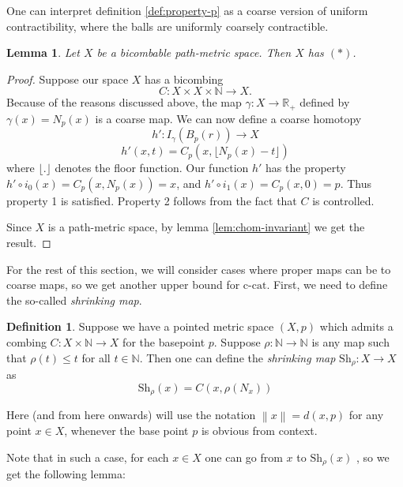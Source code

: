 \documentclass {amsart}
\newcommand {\ccat}     {\text{c-cat}}
\newcommand {\N}        {\mathbb{N}}
\newcommand {\Rplus}    {\mathbb{R}_{+}}
\newcommand {\shr}      {\text {Sh} _{\rho}}
\newcommand {\norm} [1] {\left\| #1 \right\|}
\newtheorem   {lemma}       [theorem] {Lemma}
\theoremstyle {definition}
\newtheorem   {definition}  [theorem] {Definition}
\begin{document}
One can interpret definition \ref{def:property-p} as a coarse version of uniform
contractibility, where the balls are uniformly coarsely contractible.

\begin{lemma}
    \label{lem:bicomb-property-p}
Let \( X \) be a bicombable path-metric space. Then \( X \) has \( (\ast) \).
\end{lemma}

\begin{proof}
  Suppose our space \( X \) has a bicombing
  \[ 
    C : X \times X \times \N \to X 
  .\]
  Because of the reasons discussed above, the map \( \gamma : X \to \Rplus \)
  defined by \( \gamma(x) = N_p(x) \) is a coarse map. We can now define a
  coarse homotopy
  \[
    h' : I_{\gamma} (B_p(r)) \to X
  \]
  \[
    h'(x, t) = C_p (x, \lfloor N_p(x) - t\rfloor)
  \]
  where \( \lfloor . \rfloor \) denotes the floor function. Our function \(
  h'\) has the property \( h' \circ i_0 (x) = C_p(x, N_p(x)) = x \), and \( h'
  \circ i_1 (x) = C_p(x, 0) = p \). Thus property 1 is satisfied. Property 2
  follows from the fact that \( C \) is controlled.

  Since \( X \) is a path-metric space, by lemma \ref{lem:chom-invariant} we get
  the result.
\end{proof}

For the rest of this section, we will consider cases where proper maps can be
 to coarse maps, so we get another upper bound for \( \ccat \).
First, we need to define the so-called \emph{shrinking map}.

\begin{definition}
  Suppose we have a pointed metric space \( (X,p) \) which admits a combing \( C :
  X \times \N \to X \) for the basepoint \( p \). Suppose \( \rho : \N \to
  \N \) is any map such that \( \rho(t)  \leq t \) for all \( t \in \N
  \). Then one can define the \emph{shrinking map} \( \shr : X \to X \) as
  \begin{equation}
    \label {eqn:shrinking}
    \shr (x) = C \left( x, \rho (N_x) \right)
  \end{equation}
\end{definition}

Here (and from here onwards) will use the notation \( \norm x = d (x, p) \) for
any point \( x \in X \), whenever the base point \( p \) is obvious from
context. 

Note that in such a case, for each \( x \in X \) one can go from \( x \) to \(
\shr (x) \) , so we get the following lemma:
\end{document}
